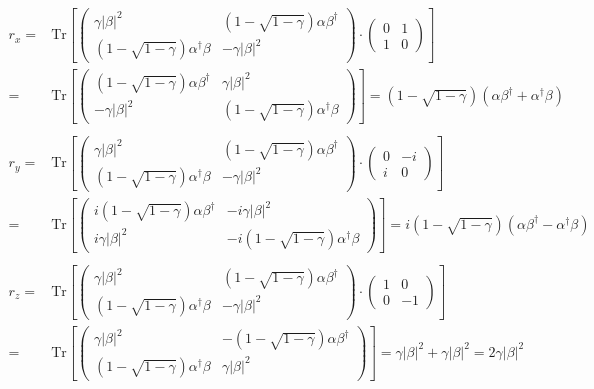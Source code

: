 \begin{equation}
  \begin{split}
    r_{x} = &  \text{Tr} \left[ \begin{pmatrix}
  \gamma |\beta|^{2} & (1-\sqrt{1-\gamma}) \alpha \beta^{\dag}\\
  (1-\sqrt{1-\gamma}) \alpha^{\dag} \beta & -\gamma |\beta|^{2} 
  \end{pmatrix} \cdot \begin{pmatrix}
  0&1\\
  1&0
  \end{pmatrix} \right]  \\
  = & \text{Tr} \left[ \begin{pmatrix}
  (1-\sqrt{1-\gamma}) \alpha \beta^{\dag} & \gamma |\beta|^{2}\\
  -\gamma |\beta|^{2} & (1-\sqrt{1-\gamma}) \alpha^{\dag} \beta
  \end{pmatrix} \right] = (1-\sqrt{1-\gamma}) (\alpha \beta^{\dag}  + \alpha^{\dag} \beta) \\
  & \\
  r_{y} = &  \text{Tr} \left[ \begin{pmatrix}
  \gamma |\beta|^{2} & (1-\sqrt{1-\gamma}) \alpha \beta^{\dag}\\
  (1-\sqrt{1-\gamma}) \alpha^{\dag} \beta & -\gamma |\beta|^{2}
  \end{pmatrix} \cdot \begin{pmatrix}
  0&-i\\
  i&0
  \end{pmatrix} \right]  \\
  = & \text{Tr} \left[ \begin{pmatrix}
  i (1-\sqrt{1-\gamma}) \alpha \beta^{\dag} & -i \gamma |\beta|^{2}\\
  i \gamma |\beta|^{2} & -i (1-\sqrt{1-\gamma}) \alpha^{\dag} \beta
  \end{pmatrix} \right] = i(1-\sqrt{1-\gamma}) (\alpha \beta^{\dag} - \alpha^{\dag} \beta) \\
  & \\
  r_{z} = &  \text{Tr} \left[ \begin{pmatrix}
  \gamma |\beta|^{2} & (1-\sqrt{1-\gamma}) \alpha \beta^{\dag}\\
  (1-\sqrt{1-\gamma}) \alpha^{\dag} \beta & - \gamma |\beta|^{2}
  \end{pmatrix} \cdot \begin{pmatrix}
  1&0\\
  0&-1
  \end{pmatrix} \right]  \\
  = & \text{Tr} \left[ \begin{pmatrix}
  \gamma |\beta|^{2} & -(1-\sqrt{1-\gamma}) \alpha \beta^{\dag}\\
  (1-\sqrt{1-\gamma}) \alpha^{\dag} \beta & \gamma |\beta|^{2}
  \end{pmatrix} \right] = \gamma |\beta|^{2} + \gamma |\beta|^{2} = 2\gamma |\beta|^{2}
  \end{split}
  \end{equation}
